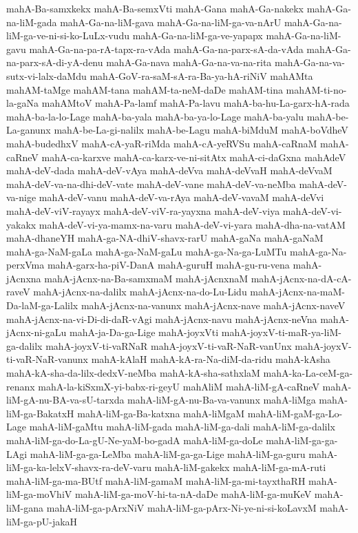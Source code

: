 {mahA-Ba-samxkekx
mahA-Ba-semxVti
mahA-Gana
mahA-Ga-nakekx
mahA-Ga-na-liM-gada
mahA-Ga-na-liM-gava
mahA-Ga-na-liM-ga-va-nArU
mahA-Ga-na-liM-ga-ve-ni-si-ko-LuLx-vudu
mahA-Ga-na-liM-ga-ve-yapapx
mahA-Ga-na-liM-gavu
mahA-Ga-na-pa-rA-tapx-ra-vAda
mahA-Ga-na-parx-sA-da-vAda
mahA-Ga-na-parx-sA-di-yA-denu
mahA-Ga-nava
mahA-Ga-na-va-na-rita
mahA-Ga-na-va-sutx-vi-lalx-daMdu
mahA-GoV-ra-saM-sA-ra-Ba-ya-hA-riNiV
mahAMta
mahAM-taMge
mahAM-tana
mahAM-ta-neM-daDe
mahAM-tina
mahAM-ti-no-la-gaNa
mahAMtoV
mahA-Pa-lamf
mahA-Pa-lavu
mahA-ba-hu-La-garx-hA-rada
mahA-ba-la-lo-Lage
mahA-ba-yala
mahA-ba-ya-lo-Lage
mahA-ba-yalu
mahA-be-La-ganunx
mahA-be-La-gi-nalilx
mahA-be-Lagu
mahA-biMduM
mahA-boVdheV
mahA-budedhxV
mahA-cA-yaR-riMda
mahA-cA-yeRVSu
mahA-caRnaM
mahA-caRneV
mahA-ca-karxve
mahA-ca-karx-ve-ni-sitAtx
mahA-ci-daGxna
mahAdeV
mahA-deV-dada
mahA-deV-vAya
mahA-deVva
mahA-deVvaH
mahA-deVvaM
mahA-deV-va-na-dhi-deV-vate
mahA-deV-vane
mahA-deV-va-neMba
mahA-deV-va-nige
mahA-deV-vanu
mahA-deV-va-rAya
mahA-deV-vavaM
mahA-deVvi
mahA-deV-viV-rayayx
mahA-deV-viV-ra-yayxna
mahA-deV-viya
mahA-deV-vi-yakakx
mahA-deV-vi-ya-mamx-na-varu
mahA-deV-vi-yara
mahA-dha-na-vatAM
mahA-dhaneYH
mahA-ga-NA-dhiV-shavx-rarU
mahA-gaNa
mahA-gaNaM
mahA-ga-NaM-gaLa
mahA-ga-NaM-gaLu
mahA-ga-Na-ga-LuMTu
mahA-ga-Na-perxVma
mahA-garx-ha-piV-DanA
mahA-guruH
mahA-gu-ru-vena
mahA-jAcnxna
mahA-jAcnx-na-Ba-samxmaM
mahA-jAcnxnaM
mahA-jAcnx-na-dA-cA-raveV
mahA-jAcnx-na-dalilx
mahA-jAcnx-na-do-Lu-Lidu
mahA-jAcnx-na-maM-Da-laM-ga-Lalilx
mahA-jAcnx-na-vanunx
mahA-jAcnx-nave
mahA-jAcnx-naveV
mahA-jAcnx-na-vi-Di-di-daR-vAgi
mahA-jAcnx-navu
mahA-jAcnx-neVna
mahA-jAcnx-ni-gaLu
mahA-ja-Da-ga-Lige
mahA-joyxVti
mahA-joyxV-ti-maR-ya-liM-ga-dalilx
mahA-joyxV-ti-vaRNaR
mahA-joyxV-ti-vaR-NaR-vanUnx
mahA-joyxV-ti-vaR-NaR-vanunx
mahA-kAlaH
mahA-kA-ra-Na-diM-da-ridu
mahA-kAsha
mahA-kA-sha-da-lilx-dedxV-neMba
mahA-kA-sha-sathxlaM
mahA-ka-La-ceM-ga-renanx
mahA-la-kiSxmX-yi-babx-ri-geyU
mahAliM
mahA-liM-gA-caRneV
mahA-liM-gA-nu-BA-va-sU-tarxda
mahA-liM-gA-nu-Ba-va-vanunx
mahA-liMga
mahA-liM-ga-BakatxH
mahA-liM-ga-Ba-katxna
mahA-liMgaM
mahA-liM-gaM-ga-Lo-Lage
mahA-liM-gaMtu
mahA-liM-gada
mahA-liM-ga-dali
mahA-liM-ga-dalilx
mahA-liM-ga-do-La-gU-Ne-yaM-bo-gadA
mahA-liM-ga-doLe
mahA-liM-ga-ga-LAgi
mahA-liM-ga-ga-LeMba
mahA-liM-ga-ga-Lige
mahA-liM-ga-guru
mahA-liM-ga-ka-lelxV-shavx-ra-deV-varu
mahA-liM-gakekx
mahA-liM-ga-mA-ruti
mahA-liM-ga-ma-BUtf
mahA-liM-gamaM
mahA-liM-ga-mi-tayxthaRH
mahA-liM-ga-moVhiV
mahA-liM-ga-moV-hi-ta-nA-daDe
mahA-liM-ga-muKeV
mahA-liM-gana
mahA-liM-ga-pArxNiV
mahA-liM-ga-pArx-Ni-ye-ni-si-koLavxM
mahA-liM-ga-pU-jakaH
}

